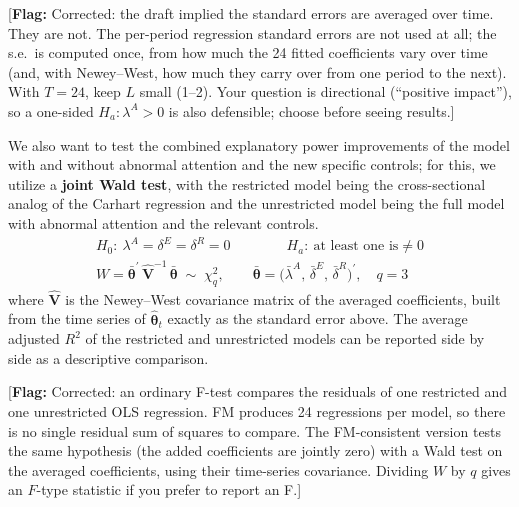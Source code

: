 \documentclass[11pt]{article}
\newcommand{\flag}[1]{{\color{red!75!black}\small [\textbf{Flag:} #1]}}
\begin{document}
\flag{Corrected: the draft implied the standard errors are averaged over time. They are not. The per-period regression standard errors are not used at all; the s.e.\ is computed once, from how much the 24 fitted coefficients vary over time (and, with Newey--West, how much they carry over from one period to the next). With $T = 24$, keep $L$ small (1--2). Your question is directional (``positive impact''), so a one-sided $H_a: \lambda^{A} > 0$ is also defensible; choose before seeing results.}

We also want to test the combined explanatory power improvements of the model with and without abnormal attention and the new specific controls; for this, we utilize a \textbf{joint Wald test}, with the restricted model being the cross-sectional analog of the Carhart regression and the unrestricted model being the full model with abnormal attention and the relevant controls.
\begin{gather}
H_0:\ \lambda^{A} = \delta^{E} = \delta^{R} = 0 \qquad\qquad H_a:\ \text{at least one is} \neq 0 \\[4pt]
W = \bar{\boldsymbol{\theta}}^{\prime}\,\widehat{\mathbf{V}}^{-1}\,\bar{\boldsymbol{\theta}} \;\sim\; \chi^2_{q}, \qquad
\bar{\boldsymbol{\theta}} = \big(\bar{\lambda}^{A},\, \bar{\delta}^{E},\, \bar{\delta}^{R}\big)^{\prime}, \quad q = 3
\end{gather}
where $\widehat{\mathbf{V}}$ is the Newey--West covariance matrix of the averaged coefficients, built from the time series of $\hat{\boldsymbol{\theta}}_t$ exactly as the standard error above. The average adjusted $R^2$ of the restricted and unrestricted models can be reported side by side as a descriptive comparison.

\flag{Corrected: an ordinary F-test compares the residuals of one restricted and one unrestricted OLS regression. FM produces 24 regressions per model, so there is no single residual sum of squares to compare. The FM-consistent version tests the same hypothesis (the added coefficients are jointly zero) with a Wald test on the averaged coefficients, using their time-series covariance. Dividing $W$ by $q$ gives an $F$-type statistic if you prefer to report an F.}
\end{document}
